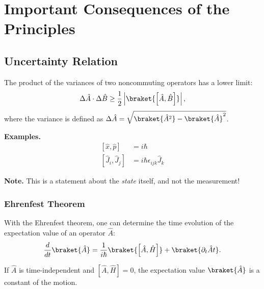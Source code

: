 \section{Important Consequences of the Principles}
\subsection{Uncertainty Relation}

The product of the variances of two noncommuting operators has a lower limit:
\begin{align}
    \Delta \hat{A} \cdot \Delta \hat{B} \geq \frac{1}{2} \left| \braket{\left[\hat{A},\hat{B}\right]} \right|,
\end{align}
where the variance is defined as $\Delta \hat{A} = \sqrt{\braket{\hat{A}^2}-\braket{\hat{A}}^2}$.

\textbf{Examples.}
\begin{align}
	\left[ \hat{x}, \hat{p} \right] &= i \hbar \\
\left[ \hat{J}_i , \hat{J}_j \right] &= i \hbar \epsilon_{ijk} \hat{J}_k
\end{align}
				
\textbf{Note.} This is a statement about the \emph{state} itself, and not the measurement!

\subsubsection{Ehrenfest Theorem}
With the Ehrenfest theorem, one can determine the time evolution of the expectation value of an operator $\hat{A}$:
\begin{align}
 \frac{d}{dt}\braket{\hat{A}}=\frac{1}{i\hbar}\braket{\left[\hat{A},\hat{H}\right]}+\braket{\partial_t{\hat{A}}{t}}. \label{eq:ehrenfest}
\end{align}

If $\hat{A}$ is time-independent and $\left[\hat{A},\hat{H}\right]=0$, the expectation value $\braket{\hat{A}}$ is a constant of the motion.